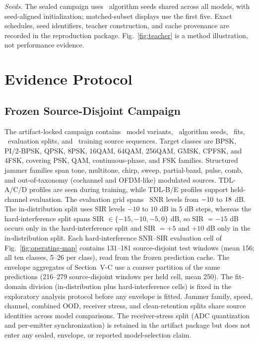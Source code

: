 \documentclass[letterpaper,journal]{IEEEtran}
\begin{document}
\emph{Seeds.} The sealed campaign uses \ProtocolSeedCount\ algorithm seeds
shared across all models, with seed-aligned initialization; matched-subset
displays use the first five. Exact schedules, seed identifiers, teacher construction,
and cache provenance are recorded in the reproduction package.
Fig.~\ref{fig:teacher} is a method illustration, not performance evidence.

\section{Evidence Protocol}
\subsection{Frozen Source-Disjoint Campaign}
The artifact-locked campaign contains \ProtocolModelCount\ model variants,
\ProtocolSeedCount\ algorithm seeds, \ProtocolFitCount\ fits,
\ProtocolSplitCount\ evaluation splits, and \ProtocolTrainSources\ training
source sequences. Target classes are BPSK, PI/2-BPSK, QPSK, 8PSK, 16QAM, 64QAM, 256QAM, GMSK,
CPFSK, and 4FSK, covering PSK, QAM, continuous-phase, and FSK families.
Structured jammer families span tone, multitone, chirp, sweep, partial-band,
pulse, comb, and out-of-taxonomy (cochannel and OFDM-like) modulated sources. TDL-A/C/D
profiles are seen during training, while TDL-B/E profiles support held-channel
evaluation. The evaluation grid spans \SnrGridCount\ SNR levels from
$-10$ to $18$ dB. The in-distribution split uses SIR levels
$-10$ to $10$ dB in $5$ dB steps, whereas the hard-interference split spans
SIR $\in\{-15,-10,-5,0\}$ dB, so SIR $=-15$ dB occurs only in the
hard-interference split and SIR $=+5$ and $+10$ dB only in the in-distribution
split. Each hard-interference SNR--SIR evaluation cell of
Fig.~\ref{fig:operating-map} contains 131--181 source-disjoint test windows
(mean 156; all ten classes, 5--26 per class), read from the frozen prediction
cache. The envelope aggregates of Section~V-C use a coarser partition of the
same predictions (216--279 source-disjoint windows per held cell, mean 250). The fit-domain division
(in-distribution plus hard-interference cells) is fixed in the exploratory
analysis protocol before any envelope is fitted. Jammer family, speed, channel, combined OOD, receiver stress, and
clean-retention splits share source identities across model comparisons. The
receiver-stress split (ADC quantization and per-emitter synchronization) is
retained in the artifact package but does not enter any sealed, envelope, or
reported model-selection claim.
\end{document}
